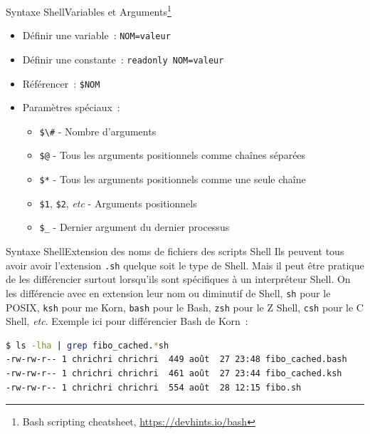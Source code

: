\documentclass{beamer}
\begin{document}
    \begin{frame}{Syntaxe Shell}{Variables et Arguments\footnote{\label{devhint-bash}Bash scripting cheatsheet, \url{https://devhints.io/bash}}}
        \bigbreak
        \begin{itemize}
            \item Définir une variable~: \lstinline{NOM=valeur}
            \item Définir une constante~: \lstinline{readonly NOM=valeur}
            \item Référencer~: \lstinline{$NOM}
            \item Paramètres spéciaux~:
            \begin{itemize}
                \item \lstinline{$\#} - Nombre d'arguments
                \item \lstinline{$@} - Tous les arguments positionnels comme chaînes séparées
                \item \lstinline{$*} - Tous les arguments positionnels comme une seule chaîne
                \item \lstinline{$1}, \lstinline{$2}, \textit{etc} - Arguments positionnels
                \item \lstinline{$_} - Dernier argument du dernier processus
            \end{itemize}
        \end{itemize}
    \end{frame}

    \begin{frame}[fragile]{Syntaxe Shell}{Extension des noms de fichiers des scripts Shell}
        Ils peuvent tous avoir avoir l'extension \lstinline{.sh} quelque soit le type de Shell.
        \bigbreak
        Mais il peut être pratique de les différencier surtout lorsqu'ils sont spécifiques à un interpréteur Shell.
        On les différencie avec en extension leur nom ou diminutif de Shell, \lstinline{sh} pour le POSIX, \lstinline{ksh} pour me Korn, \lstinline{bash} pour le Bash, \lstinline{zsh} pour le Z Shell, \lstinline{csh} pour le C Shell, \textit{etc}.
        \bigbreak
        Exemple ici pour différencier Bash de Korn~:
        \begin{lstlisting}[language=bash]
$ ls -lha | grep fibo_cached.*sh
-rw-rw-r-- 1 chrichri chrichri  449 août  27 23:48 fibo_cached.bash
-rw-rw-r-- 1 chrichri chrichri  461 août  27 23:44 fibo_cached.ksh
-rw-rw-r-- 1 chrichri chrichri  554 août  28 12:15 fibo.sh
        \end{lstlisting}
    \end{frame}
\end{document}
